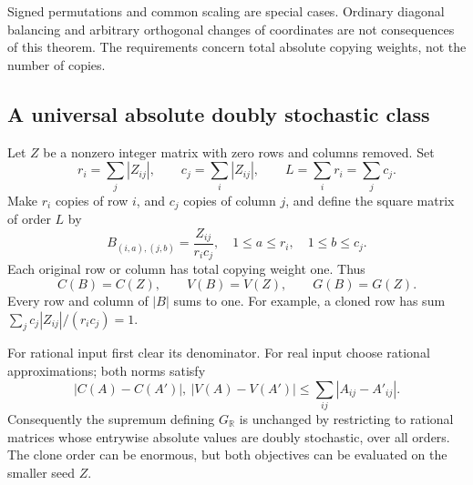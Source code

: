\documentclass[11pt]{article}
\newcommand{\R}{\mathbb R}
\newcommand{\GR}{G_{\R}}
\begin{document}
Signed permutations and common scaling are special cases. Ordinary
diagonal balancing and arbitrary orthogonal changes of coordinates are
not consequences of this theorem. The requirements concern total
absolute copying weights, not the number of copies.

\subsection{A universal absolute doubly stochastic class}
Let $Z$ be a nonzero integer matrix with zero rows and columns removed.
Set
\[
 r_i=\sum_j|Z_{ij}|,\qquad c_j=\sum_i|Z_{ij}|,
 \qquad L=\sum_i r_i=\sum_jc_j.
\]
Make $r_i$ copies of row $i$, and $c_j$ copies of column $j$, and define
the square matrix of order $L$ by
\begin{equation}\label{eq:clone}
 \boxed{\quad B_{(i,a),(j,b)}=\frac{Z_{ij}}{r_ic_j},
 \quad 1\le a\le r_i,\quad1\le b\le c_j.\quad}
\end{equation}
Each original row or column has total copying weight one. Thus
\begin{equation}\label{eq:clone-norm}
 C(B)=C(Z),\qquad V(B)=V(Z),\qquad G(B)=G(Z).
\end{equation}
Every row and column of $|B|$ sums to one. For example, a cloned row
has sum $\sum_jc_j|Z_{ij}|/(r_ic_j)=1$.

For rational input first clear its denominator. For real input choose
rational approximations; both norms satisfy
\begin{equation}\label{eq:lipschitz}
 |C(A)-C(A')|,\ |V(A)-V(A')|
                 \le\sum_{ij}|A_{ij}-A'_{ij}|.
\end{equation}
Consequently the supremum defining $\GR$ is unchanged by restricting
to rational matrices whose entrywise absolute values are doubly stochastic,
over all orders. The clone order can be enormous, but both objectives
can be evaluated on the smaller seed $Z$.
\end{document}
